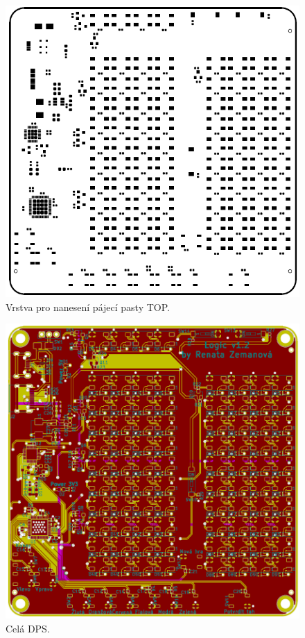   \begin{figure}[!h]
    \begin{center}
      \includegraphics[scale=0.9]{prilohy/Verze2_pasta_TOP.png}
    \end{center}
    \caption[Vrstva pro nanesení pájecí pasty TOP]{Vrstva pro nanesení pájecí pasty TOP.}
  \end{figure}

  \begin{figure}[!h]
    \begin{center}
      \includegraphics[scale=0.7]{prilohy/Verze2_DPS_cela.png}
    \end{center}
    \caption[Celá DPS]{Celá DPS.}
  \end{figure}

